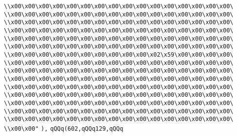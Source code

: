 \verb|\\x00\x00\x00\x00\x00\x00\x00\x00\x00\x00\x00\x00\x00\x00\x00\x00\|\newline
\verb|\\x00\x00\x00\x00\x00\x00\x00\x00\x00\x00\x00\x00\x00\x00\x00\x00\|\newline
\verb|\\x00\x00\x00\x00\x00\x00\x00\x00\x00\x00\x00\x00\x00\x00\x00\x00\|\newline
\verb|\\x00\x00\x00\x00\x00\x00\x00\x00\x00\x00\x00\x00\x00\x00\x00\x00\|\newline
\verb|\\x00\x00\x00\x00\x00\x00\x00\x00\x00\x00\x00\x00\x00\x00\x00\x00\|\newline
\verb|\\x00\x00\x00\x00\x00\x00\x00\x00\x00\x00\x00\x00\x00\x00\x00\x00\|\newline
\verb|\\x00\x00\x00\x00\x00\x00\x00\x00\x00\x00\x02\x59\x00\x00\x00\x00\|\newline
\verb|\\x00\x00\x00\x00\x00\x00\x00\x00\x00\x00\x00\x00\x00\x00\x00\x00\|\newline
\verb|\\x00\x00\x00\x00\x00\x00\x00\x00\x00\x00\x00\x00\x00\x00\x00\x00\|\newline
\verb|\\x00\x00\x00\x00\x00\x00\x00\x00\x00\x00\x00\x00\x00\x00\x00\x00\|\newline
\verb|\\x00\x00\x00\x00\x00\x00\x00\x00\x00\x00\x00\x00\x00\x00\x00\x00\|\newline
\verb|\\x00\x00\x00\x00\x00\x00\x00\x00\x00\x00\x00\x00\x00\x00\x00\x00\|\newline
\verb|\\x00\x00\x00\x00\x00\x00\x00\x00\x00\x00\x00\x00\x00\x00\x00\x00\|\newline
\verb|\\x00\x00\x00\x00\x00\x00\x00\x00\x00\x00\x00\x00\x00\x00\x00\x00\|\newline
\verb|\\x00\x00\x00\x00\x00\x00\x00\x00\x00\x00\x00\x00\x00\x00\x00\x00\|\newline
\verb|\\x00\x00"|\newline
\verb|),|\newline
\verb|qQQq(602,qQQq129,qQQq|\newline
